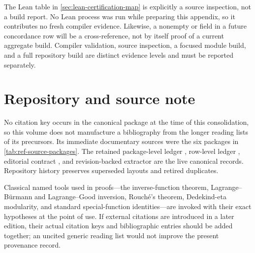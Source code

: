 The Lean table in \cref{sec:lean-certification-map} is explicitly a source
inspection, not a build report.  No Lean process was run while preparing this
appendix, so it contributes no fresh compiler evidence.  Likewise, a
nonempty  or  field in a future
concordance row will be a cross-reference, not by itself proof of a current
aggregate build.  Compiler validation, source inspection, a focused module
build, and a full repository build are distinct evidence levels and must be
reported separately.

\section{Repository and source note}
\label{sec:ref-repository-note}

No citation key occurs in the canonical package at the time of this
consolidation, so this volume does not manufacture a bibliography from the
longer reading lists of its precursors.  Its immediate documentary sources
were the six packages in \cref{tab:ref-source-packages}.  The retained
package-level ledger , row-level ledger
, editorial contract , and
revision-backed extractor  are the live
canonical records.  Repository history preserves superseded layouts and
retired duplicates.

Classical named tools used in proofs---the inverse-function theorem,
Lagrange--B\"urmann and Lagrange--Good inversion, Rouch\'e's theorem,
Dedekind-eta modularity, and standard special-function identities---are
invoked with their exact hypotheses at the point of use.  If external
citations are introduced in a later edition, their actual citation keys and
bibliographic entries should be added together; an uncited generic reading
list would not improve the present provenance record.
